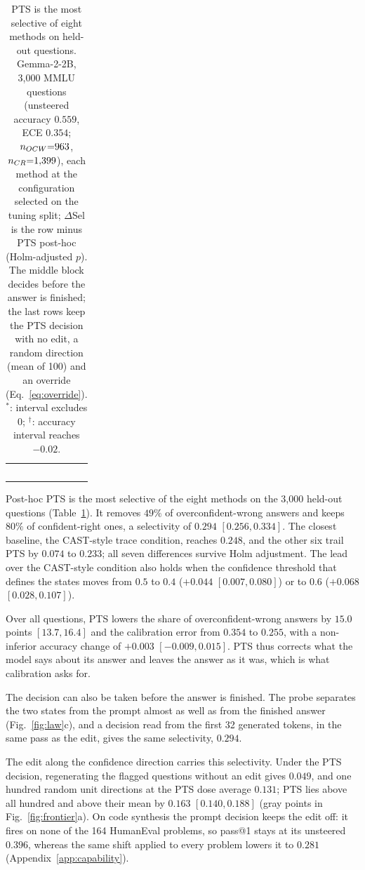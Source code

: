 \begin{table}[t]
{\begin{tabular}{l|ccc|cc|cc}
$$\hline
\end{tabular}}
\caption{PTS is the most selective of eight methods on held-out questions.
Gemma-2-2B, 3{,}000 MMLU questions (unsteered accuracy $0.559$, ECE $0.354$;
$n_{\ocw}{=}963$, $n_{\crok}{=}1{,}399$), each method at the configuration
selected on the tuning split; $\Delta$Sel is the row minus PTS post-hoc
(Holm-adjusted $p$). The middle block decides before the answer is finished;
the last rows keep the PTS decision with no edit, a random direction (mean of
100) and an override (Eq.~\eqref{eq:override}). $^*$: interval excludes $0$;
$^\dagger$: accuracy interval reaches $-0.02$.}
\label{tab:confirm}
\end{table}

Post-hoc PTS is the most selective of the eight methods on the 3{,}000
held-out questions (Table~\ref{tab:confirm}). It removes $49\%$ of overconfident-wrong answers
and keeps $80\%$ of confident-right ones, a selectivity of $0.294$
$[0.256, 0.334]$. The closest baseline, the CAST-style trace condition,
reaches $0.248$, and the other six trail PTS by $0.074$ to $0.233$; all seven
differences survive Holm adjustment. The lead over the CAST-style condition
also holds when the confidence threshold that defines the states moves from
$0.5$ to $0.4$ ($+0.044$ $[0.007, 0.080]$) or to $0.6$ ($+0.068$
$[0.028, 0.107]$).

Over all questions, PTS lowers the share of overconfident-wrong answers by
$15.0$ points $[13.7, 16.4]$ and the calibration error from $0.354$ to
$0.255$, with a non-inferior accuracy change of $+0.003$ $[-0.009, 0.015]$. PTS
thus corrects what the model says about its answer and leaves the answer as it
was, which is what calibration asks for.

The decision can also be taken before the answer is finished. The probe
separates the two states from the prompt almost as well as from the finished
answer (Fig.~\ref{fig:law}c), and a decision read from the first 32 generated
tokens, in the same pass as the edit, gives the same selectivity, $0.294$.

The edit along the confidence direction carries this selectivity. Under the
PTS decision, regenerating the flagged questions without an edit gives
$0.049$, and one hundred random unit directions at the PTS dose average
$0.131$; PTS lies above all hundred and above their mean by $0.163$
$[0.140, 0.188]$ (gray points in Fig.~\ref{fig:frontier}a). On code synthesis
the prompt decision keeps the edit off: it fires on none of the 164 HumanEval
problems, so pass@1 stays at its unsteered $0.396$, whereas the same shift
applied to every problem lowers it to $0.281$ (Appendix~\ref{app:capability}).

